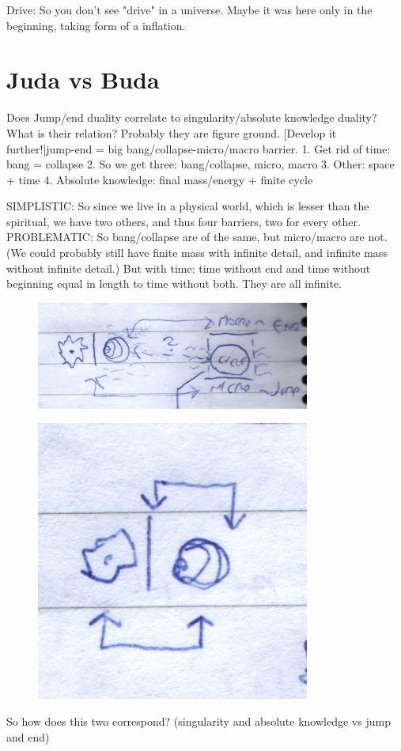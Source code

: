\documentclass[10pt]{book}
\begin{document}
Drive: So you don't see "drive" in a universe. Maybe it was here only in the beginning, taking form of a inflation.


\chapter{Juda vs Buda}

Does Jump/end duality correlate to singularity/absolute knowledge duality? What is their relation? Probably they are figure ground. [Develop it further!]jump-end = big bang/collapse-micro/macro barrier.
1. Get rid of time: bang = collapse
2. So we get three: bang/collapse, micro, macro
3. Other: space + time
4. Absolute knowledge: final mass/energy + finite cycle

SIMPLISTIC:
So since we live in a physical world, which is lesser than the spiritual, we have two others, and thus four barriers, two for every other.
PROBLEMATIC:
So bang/collapse are of the same, but micro/macro are not. (We could probably still have finite mass with infinite detail, and infinite mass without infinite detail.) But with time: time without end and time without beginning equal in length to time without both. They are all infinite.
\begin{figure}[ht!]
\centering
\includegraphics[width=90mm]{scan07.jpg}
\label{overflow}
\end{figure}
\begin{figure}[ht!]
\centering
\includegraphics[width=90mm]{scan08.jpg}
\label{overflow}
\end{figure}
So how does this two correspond? (singularity and absolute knowledge vs jump and end)
\end{document}
